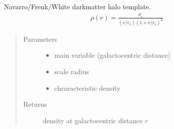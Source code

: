 \documentclass[letterpaper,10pt,english]{sphinxmanual}
\begin{document}

\begin{fulllineitems}
\label{\detokenize{diffsph.profiles:diffsph.profiles.templates.nfw}}
\sphinxAtStartPar
Navarro/Frenk/White dark\sphinxhyphen{}matter halo template.
\begin{equation*}
\begin{split}\rho(r) = \frac{\rho_s}{(r/r_s)(1+r/r_s)^2}\end{split}
\end{equation*}\begin{quote}\begin{description}
\item[{Parameters}] \leavevmode\begin{itemize}
\item {} 
\sphinxAtStartPar
{} \textendash{} main variable (galactocentric distance)

\item {} 
\sphinxAtStartPar
{} \textendash{} scale radius

\item {} 
\sphinxAtStartPar
{} \textendash{} chraracteristic density

\end{itemize}

\item[{Returns}] \leavevmode
\sphinxAtStartPar
density at galactocentric distance \(r\)

\end{description}\end{quote}

\end{fulllineitems}

\end{document}
